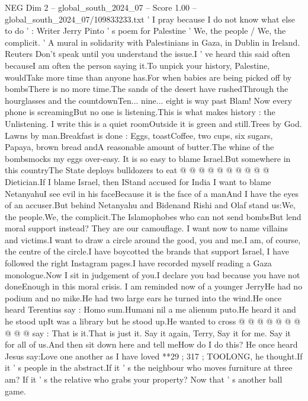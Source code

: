 \begin{textsample}{NEG Dim 2 – global\_south\_2024\_07 – Score 1.00 – global\_south\_2024\_07/109833233.txt}  \label{ex:f2_neg_376}
' I pray because I do not know what else to do ' : Writer Jerry Pinto ' s poem for Palestine ' We, the people / We, the complicit. ' A mural in solidarity with Palestinians in Gaza, in Dublin in Ireland.
Reuters Don't speak until you understand the issue.I ' ve heard this said often becauseI am often the person saying it.To unpick your history, Palestine, wouldTake more time than anyone has.For when babies are being picked off by bombsThere is no more time.The sands of the desert have rushedThrough the hourglasses and the countdownTen... nine... eight is way past Blam!
Now every phone is screamingBut no one is listening.This is what makes history : the Unlistening.
I write this is a quiet roomOutside it is green and still.Trees by God.
Lawns by man.Breakfast is done : Eggs, toastCoffee, two cups, six sugars, Papaya, brown bread andA reasonable amount of butter.The whine of the bombsmocks my eggs over-easy.
It is so easy to blame Israel.But somewhere in this countryThe State deploys bulldozers to eat @ @ @ @ @ @ @ @ @ @ Dietician.If I blame Israel, then IStand accused for India I want to blame NetanyahuI see evil in his faceBecause it is the face of a manAnd I have the eyes of an accuser.But behind Netanyahu and Bidenand Rishi and Olaf stand us:We, the people.We, the complicit.The Islamophobes who can not send bombsBut lend moral support instead?
They are our camouflage.
I want now to name villains and victims.I want to draw a circle around the good, you and me.I am, of course, the centre of the circle.I have boycotted the brands that support Israel, I have followed the right Instagram pages.I have recorded myself reading a Gaza monologue.Now I sit in judgement of you.I declare you bad because you have not doneEnough in this moral crisis.
I am reminded now of a younger JerryHe had no podium and no mike.He had two large ears he turned into the wind.He once heard Terentius say : Homo sum.Humani nil a me alienum puto.He heard it and he stood upIt was a library but he stood up.He wanted to cross @ @ @ @ @ @ @ @ @ @ say : That is it.That is just it.
Say it again, Terry, Say it for me.
Say it for all of us.And then sit down here and tell meHow do I do this?
He once heard Jesus say:Love one another as I have loved **29 ; 317 ; TOOLONG, he thought.If it ' s people in the abstract.If it ' s the neighbour who moves furniture at three am?
If it ' s the relative who grabs your property?
Now that ' s another ball game.

\end{textsample}
